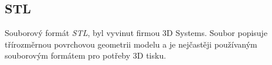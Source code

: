 \subsection{STL}
Souborový formát \textit{\gls{STL}}, byl vyvinut firmou 3D Systems. Soubor popisuje třírozměrnou povrchovou geometrii modelu a je nejčastěji používaným souborovým formátem pro potřeby 3D tisku. \autocite{3DAddFab}
